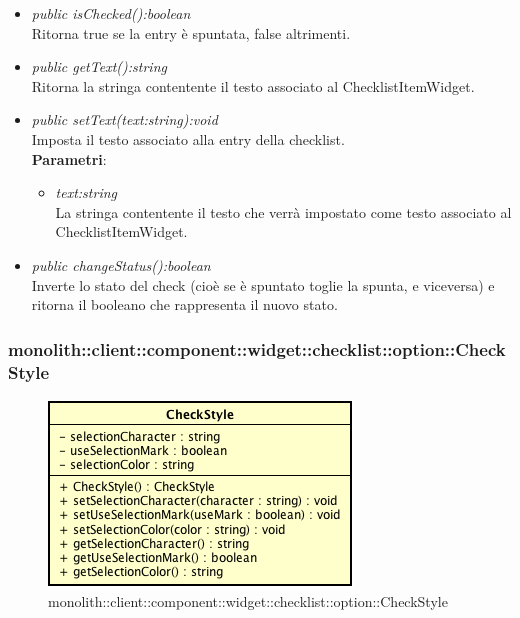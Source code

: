 \begin{itemize}
\begin{itemize}
	\item \textit{public isChecked():boolean}\\
	Ritorna true se la entry è spuntata, false altrimenti.
	\item \textit{public getText():string}\\
	Ritorna la stringa contentente il testo associato al ChecklistItemWidget.
	\item \textit{public setText(text:string):void}\\
	Imposta il testo associato alla entry della checklist.
		\\ \textbf{Parametri}: \begin{itemize}
		\item \textit{text:string}\\
		La stringa contentente il testo che verrà impostato come testo associato al ChecklistItemWidget.
		\end{itemize} 
	\item \textit{public changeStatus():boolean}\\
	Inverte lo stato del check (cioè se è spuntato toglie la spunta, e viceversa) e ritorna il booleano che rappresenta il nuovo stato.
	\end{itemize}
\end{itemize}

\subsubsection{monolith::client::component::widget::checklist::option::CheckStyle}

\label{monolith::client::component::widget::checklist::option::CheckStyle}
\begin{figure}[H]
	\centering
	\includegraphics[scale=0.5]{Sezioni/SottosezioniST/img/CheckStyle.png}
	\caption{monolith::client::component::widget::checklist::option::CheckStyle}
\end{figure}

